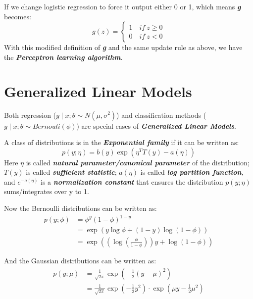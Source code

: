 \documentclass{article}
\begin{document}
If we change logistic regression to force it output either 0 or 1, which means \emph{\textbf{g}} becomes:
\begin{equation*}
g(z)=\begin{cases}
     1 \quad if \ z\geq 0 \\
     0 \quad if \ z<0
     \end{cases}
\end{equation*}
With this modified definition of \emph{\textbf{g}} and the same update rule as above, we have the \emph{\textbf{Perceptron learning algorithm}}.

\section{Generalized Linear Models}
Both regression ($y\mid x;\theta\sim N(\mu,\sigma^2)$) and classification methods ($y\mid x;\theta\sim Bernouli(\phi)$) are special cases of \emph{\textbf{Generalized Linear Models}}.

A class of distributions is in the \emph{\textbf{Exponential family}} if it can be written as:
\begin{equation*}
p(y;\eta)=b(y)\exp(\eta^TT(y)-a(\eta))
\end{equation*}
Here \emph{\textbf{$\eta$}} is called \emph{\textbf{natural parameter/canonical parameter}} of the distribution; $T(y)$ is called \emph{\textbf{sufficient statistic}}; $a(\eta)$ is called \emph{\textbf{log partition function}}, and $e^{-a(\eta)}$ is a \emph{\textbf{normalization constant}} that ensures the distribution $p(y;\eta)$ sums/integrates over y to 1.

Now the Bernoulli distributions can be written as:
\begin{align*}
p(y;\phi) &= \phi^y(1-\phi)^{1-y} \\
          &= \exp(y\log\phi+(1-y)\log(1-\phi)) \\
          &= \exp\left(\left(\log\left(\frac{\phi}{1-\phi}\right)\right)y+\log(1-\phi)\right)
\end{align*}

And the Gaussian distributions can be written as:
\begin{align*}
p(y;\mu) &= \frac{1}{\sqrt{2\pi}}\exp\left(-\frac{1}{2}(y-\mu)^2\right) \\
         &= \frac{1}{\sqrt{2\pi}}\exp\left(-\frac{1}{2}y^2\right)\cdot\exp\left(\mu y-\frac{1}{2}\mu^2\right)
\end{align*}
\end{document}
